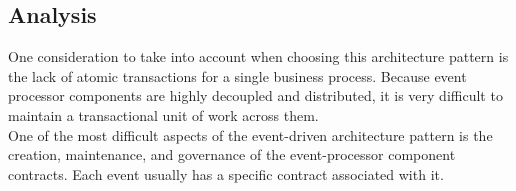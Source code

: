 \subsection{Analysis}
One consideration to take into account when choosing this architecture pattern is the lack of atomic transactions for a single business process. Because event processor components are highly decoupled and distributed, it is very difficult to maintain a transactional unit of work across them. \\
One of the most difficult aspects of the event-driven architecture pattern is the creation, maintenance, and governance of the event-processor component contracts. Each event usually has a specific contract associated with it.





